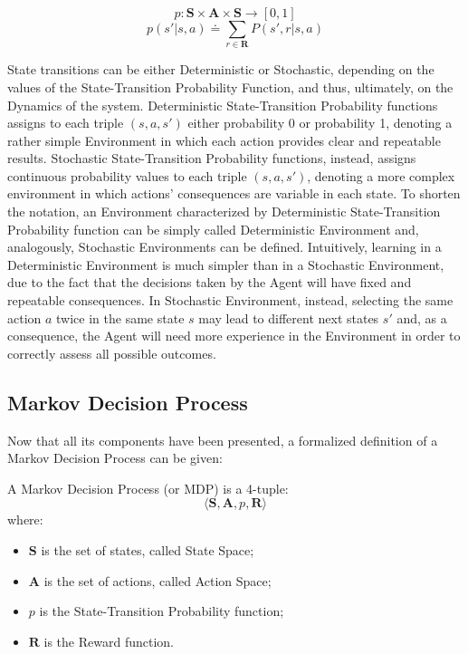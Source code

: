             \begin{definition}
                \label{def:transprob}
                \[p : \mathbf{S} \times \mathbf{A} \times \mathbf{S} \rightarrow [0, 1] \]
                \[ p(s' | s, a) \doteq \sum_{r\in \mathbf{R}} P(s', r | s, a) \]
            \end{definition}
            \noindent
            State transitions can be either Deterministic or Stochastic, depending on the values of the State-Transition Probability Function, and thus, ultimately, on the Dynamics of the system. Deterministic State-Transition Probability functions assigns to each triple $(s, a, s')$ either probability 0 or probability 1, denoting a rather simple Environment in which each action provides clear and repeatable results. Stochastic State-Transition Probability functions, instead, assigns continuous probability values to each triple $(s, a, s')$, denoting a more complex environment in which actions' consequences are variable in each state. \newline
            To shorten the notation, an Environment characterized by Deterministic State-Transition Probability function can be simply called Deterministic Environment and, analogously, Stochastic Environments can be defined. \newline
            Intuitively, learning in a Deterministic Environment is much simpler than in a Stochastic Environment, due to the fact that the decisions taken by the Agent will have fixed and repeatable consequences. In Stochastic Environment, instead, selecting the same action $a$ twice in the same state $s$ may lead to different next states $s'$ and, as a consequence, the Agent will need more experience in the Environment in order to correctly assess all possible outcomes.
            
        \subsection{Markov Decision Process}
            Now that all its components have been presented, a formalized definition of a Markov Decision Process can be given:
            
            \begin{definition}
                \label{def:mdp}
                A Markov Decision Process (or MDP) is a 4-tuple:
                \[ \langle \mathbf{S}, \mathbf{A}, p, \mathbf{R} \rangle\]
                where:
                \begin{itemize}
                    \setlength\itemsep{0em}
                    \item $\mathbf{S}$ is the set of states, called State Space;
                    \item $\mathbf{A}$ is the set of actions, called Action Space;
                    \item $p$ is the State-Transition Probability function;
                    \item $\mathbf{R}$ is the Reward function.
                \end{itemize}
            \end{definition}
            
